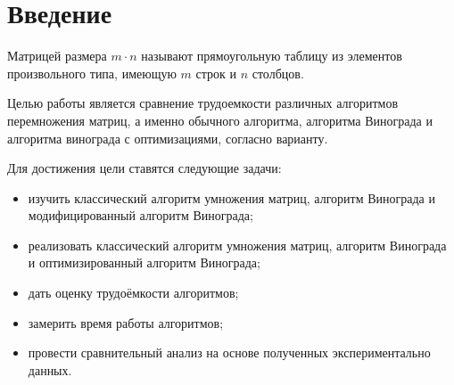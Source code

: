 \chapter*{Введение}

Матрицей размера $m \cdot n$ называют прямоугольную таблицу из элементов произвольного типа, имеющую $m$ строк и $n$ столбцов.


Целью работы является сравнение трудоемкости различных алгоритмов перемножения матриц, а именно обычного алгоритма, алгоритма Винограда и алгоритма винограда с оптимизациями, согласно варианту.

Для достижения цели ставятся следующие задачи:
\begin{itemize}
	\item изучить классический алгоритм умножения матриц, алгоритм Винограда и модифицированный алгоритм Винограда;
	\item реализовать классический алгоритм умножения матриц, алгоритм
	Винограда и оптимизированный алгоритм Винограда;
	\item дать оценку трудоёмкости алгоритмов;
	\item замерить время работы алгоритмов;
	\item провести сравнительный анализ на основе полученных экспериментально данных.
\end{itemize}
